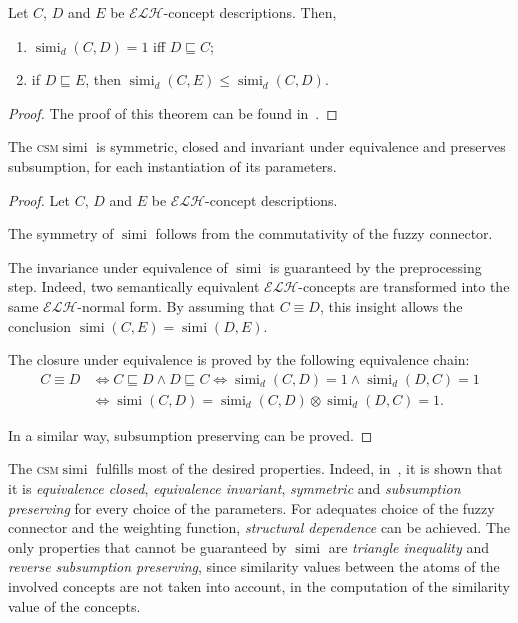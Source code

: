 \documentclass{llncs}
\DeclareMathOperator{\simi}{simi}
\newcommand{\elh}{\(\mathcal{ELH}\)\xspace}
\newcommand{\csm}{\textsc{csm}\xspace}
\begin{document}
  \begin{lemma}
    Let \(C\), \(D\) and \(E\) be \elh-concept descriptions.
    Then,
    \begin{enumerate}
      \item \(\simi_d(C,D) = 1\) iff \(D \sqsubseteq C\);
      \item if \(D \sqsubseteq E\), then \(\simi_d(C,E) \le \simi_d(C,D)\).
    \end{enumerate}
  \end{lemma}
  \begin{proof}
    The proof of this theorem can be found in~\cite{LeTu12}.
  \end{proof}
  \begin{theorem}
    The \csm \(\simi\) is symmetric, closed and invariant under equivalence and preserves subsumption, for each instantiation of its parameters.
  \end{theorem}
  \begin{proof}
    Let \(C\), \(D\) and \(E\) be \elh-concept descriptions.

    The symmetry of \(\simi\) follows from the commutativity of the fuzzy connector.

    The invariance under equivalence of \(\simi\) is guaranteed by the preprocessing step.
    Indeed, two semantically equivalent \elh-concepts are transformed into the same \elh-normal form.
    By assuming that \(C \equiv D\), this insight allows the conclusion \(\simi(C,E) = \simi(D,E)\).

    The closure under equivalence is proved by the following equivalence chain:
    \begin{equation*}
      \begin{split}
        C \equiv D &\iff C \sqsubseteq D \land D \sqsubseteq C \iff
        \simi_d(C,D) = 1 \land \simi_d(D,C) = 1 \\ &\iff
        \simi(C,D) = \simi_d(C,D) \otimes \simi_d(D,C) = 1.
      \end{split}
    \end{equation*}

    In a similar way, subsumption preserving can be proved.
  \end{proof}
  The \csm \(\simi\) fulfills most of the desired properties.
  Indeed, in~\cite{LeTu12}, it is shown that it is \emph{equivalence closed}, \emph{equivalence invariant}, \emph{symmetric} and \emph{subsumption preserving} for every choice of the parameters.
  For adequates choice of the fuzzy connector and the weighting function, \emph{structural dependence} can be achieved.
  The only properties that cannot be guaranteed by \(\simi\) are \emph{triangle inequality} and \emph{reverse subsumption preserving}, since similarity values between the atoms of the involved concepts are not taken into account, in the computation of the similarity value of the concepts.
\end{document}
